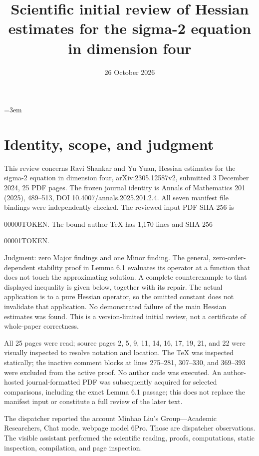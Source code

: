 \documentclass[10pt]{article}
\title{Scientific initial review of
Hessian estimates for the sigma-2 equation
in dimension four}
\author{}
\date{26 October 2026}
\begin{document}
\maketitle
=3em\par
\section*{Identity, scope, and judgment}
This review concerns Ravi Shankar and Yu Yuan, Hessian estimates for the sigma-2 equation in dimension four, arXiv:2305.12587v2, submitted 3 December 2024, 25 PDF pages. The frozen journal identity is Annals of Mathematics 201 (2025), 489–513, DOI 10.4007/annals.2025.201.2.4. All seven manifest file bindings were independently checked. The reviewed input PDF SHA-256 is\par
00000TOKEN. The bound author TeX has 1,170 lines and SHA-256\par
00001TOKEN.\par
Judgment: zero Major findings and one Minor finding. The general, zero-order-dependent stability proof in Lemma 6.1 evaluates its operator at a function that does not touch the approximating solution. A complete counterexample to that displayed inequality is given below, together with its repair. The actual application is to a pure Hessian operator, so the omitted constant does not invalidate that application. No demonstrated failure of the main Hessian estimates was found. This is a version-limited initial review, not a certificate of whole-paper correctness.\par
All 25 pages were read; source pages 2, 5, 9, 11, 14, 16, 17, 19, 21, and 22 were visually inspected to resolve notation and location. The TeX was inspected statically; the inactive comment blocks at lines 275–281, 307–330, and 369–393 were excluded from the active proof. No author code was executed. An author-hosted journal-formatted PDF was subsequently acquired for selected comparisons, including the exact Lemma 6.1 passage; this does not replace the manifest input or constitute a full review of the later text.\par
The dispatcher reported the account Minhao Liu’s Group—Academic Researchers, Chat mode, webpage model 6Pro. Those are dispatcher observations. The visible assistant performed the scientific reading, proofs, computations, static inspection, compilation, and page inspection.\par
\end{document}

